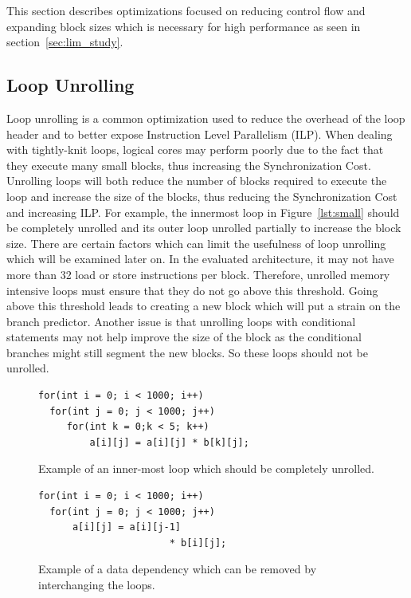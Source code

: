 This section describes optimizations focused on reducing control flow and expanding block sizes which is necessary for high performance as seen in section~\ref{sec:lim_study}.

\subsection{Loop Unrolling}
Loop unrolling is a common optimization used to reduce the overhead of the loop header and to better expose Instruction Level Parallelism (ILP).
When dealing with tightly-knit loops, logical cores may perform poorly due to the fact that they execute many small blocks, thus increasing the Synchronization Cost.
Unrolling loops will both reduce the number of blocks required to execute the loop and increase the size of the blocks, thus reducing the Synchronization Cost and increasing ILP.
For example, the innermost loop in Figure~\ref{lst:small} should be completely unrolled and its outer loop unrolled partially to increase the block size.
There are certain factors which can limit the usefulness of loop unrolling which will be examined later on.
In the evaluated architecture, it may not have more than 32 load or store instructions per block.
Therefore, unrolled memory intensive loops must ensure that they do not go above this threshold.
Going above this threshold leads to creating a new block which will put a strain on the branch predictor.
Another issue is that unrolling loops with conditional statements may not help improve the size of the block as the conditional branches might still segment the new blocks.
So these loops should not be unrolled.

\begin{figure}[t]
\lstset{language=C,numbersep=4pt,basicstyle=\small}
\begin{lstlisting}
for(int i = 0; i < 1000; i++)
  for(int j = 0; j < 1000; j++)
     for(int k = 0;k < 5; k++)
         a[i][j] = a[i][j] * b[k][j];
\end{lstlisting}
\caption{Example of an inner-most loop which should be completely unrolled.}
\end{figure}

\begin{figure}[t]
\label{lst:small}

\lstset{language=C,numbersep=4pt,basicstyle=\small}
\begin{lstlisting}
for(int i = 0; i < 1000; i++)
  for(int j = 0; j < 1000; j++)
      a[i][j] = a[i][j-1] 
                       * b[i][j];
\end{lstlisting}
\caption{Example of a data dependency which can be removed by interchanging the loops.}
\label{lst:dep}
\end{figure}


